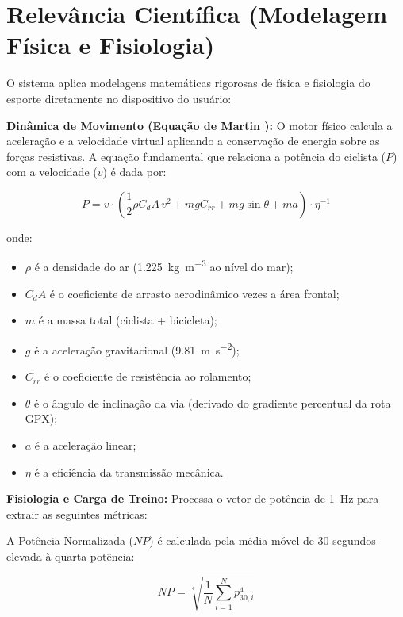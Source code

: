 \documentclass[
    a4paper,
    12pt,
    oneside,
    english,
    brazil,
    chapter=TITLE,
    section=TITLE,
]{abntex2}
\begin{document}
\section{Relevância Científica (Modelagem Física e Fisiologia)}
\label{sec:relevancia-cientifica}

O sistema aplica modelagens matemáticas rigorosas de física e fisiologia do esporte diretamente no dispositivo do usuário:

\textbf{Dinâmica de Movimento (Equação de Martin \cite{martin1998}):} O motor físico calcula a aceleração e a velocidade virtual aplicando a conservação de energia sobre as forças resistivas. A equação fundamental que relaciona a potência do ciclista ($P$) com a velocidade ($v$) é dada por:

\begin{equation}\label{eq:martin}
P = v \cdot \left( \frac{1}{2} \rho C_d A \, v^2 + m g C_{rr} + m g \sin\theta + m a \right) \cdot \eta^{-1}
\end{equation}

\noindent onde:
\begin{itemize}
    \item $\rho$ é a densidade do ar (\SI{1,225}{\kilo\gram\per\cubic\meter} ao nível do mar);
    \item $C_dA$ é o coeficiente de arrasto aerodinâmico vezes a área frontal;
    \item $m$ é a massa total (ciclista + bicicleta);
    \item $g$ é a aceleração gravitacional (\SI{9,81}{\meter\per\square\second});
    \item $C_{rr}$ é o coeficiente de resistência ao rolamento;
    \item $\theta$ é o ângulo de inclinação da via (derivado do gradiente percentual da rota GPX);
    \item $a$ é a aceleração linear;
    \item $\eta$ é a eficiência da transmissão mecânica.
\end{itemize}

\textbf{Fisiologia e Carga de Treino:} Processa o vetor de potência de \SI{1}{\hertz} para extrair as seguintes métricas:

A Potência Normalizada ($NP$) é calculada pela média móvel de 30 segundos elevada à quarta potência:

\begin{equation}\label{eq:np}
NP = \sqrt[4]{\frac{1}{N} \sum_{i=1}^{N} p_{30,i}^4}
\end{equation}
\end{document}
